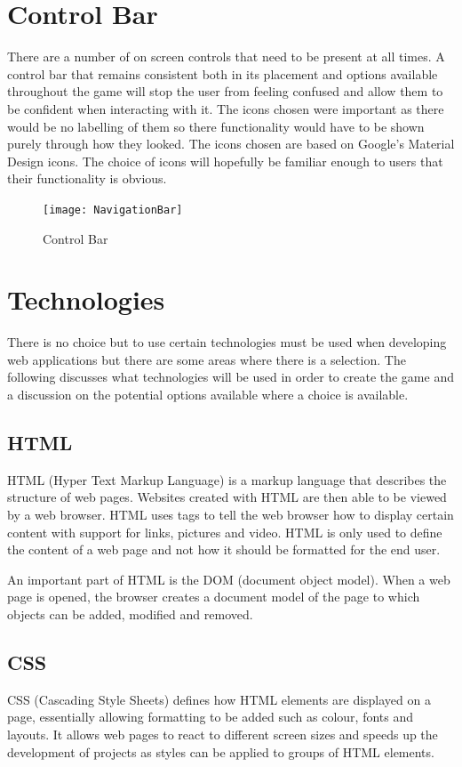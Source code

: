 \documentclass[12pt,a4paper]{report}
\begin{document}
\section{Control Bar}
There are a number of on screen controls that need to be present at all times. A control bar that remains consistent both in its placement and options available throughout the game will stop the user from feeling confused and allow them to be confident when interacting with it. The icons chosen were important as there would be no labelling of them so there functionality would have to be shown purely through how they looked. The icons chosen are based on Google's Material Design icons. The choice of icons will hopefully be familiar enough to users that their functionality is obvious.

\begin{figure}[h]
\centering
    \texttt{[image: NavigationBar]}
    \caption{Control Bar}
    \label{fig:floodFillBad}
\end{figure}
\FloatBarrier

\section{Technologies}
There is no choice but to use certain technologies must be used when developing web applications but there are some areas where there is a selection. The following discusses what technologies will be used in order to create the game and a discussion on the potential options available where a choice is available. 

\subsection{HTML}
HTML (Hyper Text Markup Language) is a markup language that describes the structure of web pages. Websites created with HTML are then able to be viewed by a web browser. HTML uses tags to tell the web browser how to display certain content with support for links, pictures and video. HTML is only used to define the content of a web page and not how it should be formatted for the end user.

An important part of HTML is the DOM (document object model). When a web page is opened, the browser creates a document model of the page to which objects can be added, modified and removed. 

\subsection{CSS}
CSS (Cascading Style Sheets) defines how HTML elements are displayed on a page, essentially allowing formatting to be added such as colour, fonts and layouts. It allows web pages to react to different screen sizes and speeds up the development of projects as styles can be applied to groups of HTML elements. 
\end{document}
